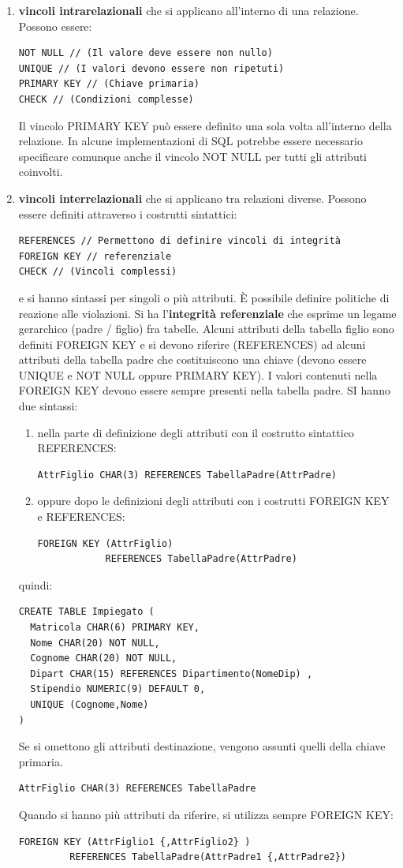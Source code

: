 \documentclass[a4paper,12pt, oneside]{book}
\begin{document}
\begin{enumerate}
\item \textbf{vincoli intrarelazionali} che si applicano all'interno di una relazione. Possono essere:
\begin{verbatim}
NOT NULL // (Il valore deve essere non nullo)
UNIQUE // (I valori devono essere non ripetuti)
PRIMARY KEY // (Chiave primaria)
CHECK // (Condizioni complesse)
\end{verbatim}
Il vincolo PRIMARY KEY può essere definito una sola volta
all'interno della relazione. In alcune implementazioni di SQL potrebbe essere
necessario specificare comunque anche il vincolo NOT NULL
per tutti gli attributi coinvolti.
\item \textbf{vincoli interrelazionali} che si applicano tra relazioni diverse. Possono essere definiti attraverso i costrutti sintattici:
\begin{verbatim}
REFERENCES // Permettono di definire vincoli di integrità
FOREIGN KEY // referenziale
CHECK // (Vincoli complessi)
\end{verbatim}
 e si hanno sintassi per singoli o più attributi. È possibile definire politiche di reazione alle violazioni. Si ha l'\textbf{integrità referenziale} che esprime un legame gerarchico (padre / figlio) fra tabelle. Alcuni attributi della tabella figlio sono definiti
FOREIGN KEY e si devono riferire (REFERENCES)
ad alcuni attributi della tabella padre che costituiscono
una chiave (devono essere UNIQUE e NOT NULL
oppure PRIMARY KEY). I valori contenuti nella FOREIGN KEY devono essere sempre presenti nella tabella padre. SI hanno due sintassi:
\begin{enumerate}
\item nella parte di definizione degli attributi con il
costrutto sintattico REFERENCES:
\begin{verbatim}
AttrFiglio CHAR(3) REFERENCES TabellaPadre(AttrPadre)
\end{verbatim}
\item oppure dopo le definizioni degli attributi con i
costrutti FOREIGN KEY e REFERENCES:
\begin{verbatim}
FOREIGN KEY (AttrFiglio)
            REFERENCES TabellaPadre(AttrPadre)
\end{verbatim}
\end{enumerate}
quindi:
\begin{verbatim}
CREATE TABLE Impiegato (
  Matricola CHAR(6) PRIMARY KEY,
  Nome CHAR(20) NOT NULL,
  Cognome CHAR(20) NOT NULL,
  Dipart CHAR(15) REFERENCES Dipartimento(NomeDip) ,
  Stipendio NUMERIC(9) DEFAULT 0,
  UNIQUE (Cognome,Nome)
)
\end{verbatim}
Se si omettono gli attributi destinazione, vengono
assunti quelli della chiave primaria.
\begin{verbatim}
AttrFiglio CHAR(3) REFERENCES TabellaPadre
\end{verbatim}
Quando si hanno più attributi da riferire, si utilizza
sempre FOREIGN KEY:
\begin{verbatim}
FOREIGN KEY (AttrFiglio1 {,AttrFiglio2} )
         REFERENCES TabellaPadre(AttrPadre1 {,AttrPadre2})
\end{verbatim}
\end{enumerate}
\end{document}
